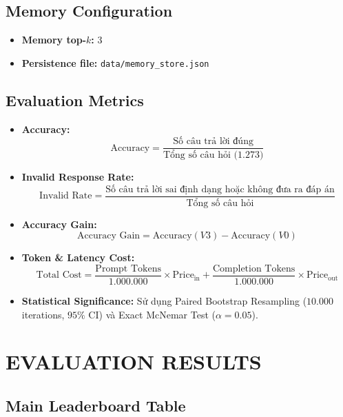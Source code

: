 \subsection{Memory Configuration}
\begin{itemize}
    \item \textbf{Memory top-$k$:} 3
    \item \textbf{Persistence file:} \texttt{data/memory\_store.json}
\end{itemize}


\subsection{Evaluation Metrics}
\begin{itemize}
    \item \textbf{Accuracy:}
    $$\text{Accuracy} = \frac{\text{Số câu trả lời đúng}}{\text{Tổng số câu hỏi (1.273)}}$$
    \item \textbf{Invalid Response Rate:}
    $$\text{Invalid Rate} = \frac{\text{Số câu trả lời sai định dạng hoặc không đưa ra đáp án}}{\text{Tổng số câu hỏi}}$$
    \item \textbf{Accuracy Gain:}
    $$\text{Accuracy Gain} = \text{Accuracy}(V3) - \text{Accuracy}(V0)$$
    \item \textbf{Token \& Latency Cost:}
    $$\text{Total Cost} = \frac{\text{Prompt Tokens}}{1.000.000} \times \text{Price}_{\text{in}} + \frac{\text{Completion Tokens}}{1.000.000} \times \text{Price}_{\text{out}}$$
    \item \textbf{Statistical Significance:} Sử dụng Paired Bootstrap Resampling ($10.000$ iterations, $95\%$ CI) và Exact McNemar Test ($\alpha = 0.05$).
\end{itemize}

\section{EVALUATION RESULTS}

\subsection{Main Leaderboard Table}

